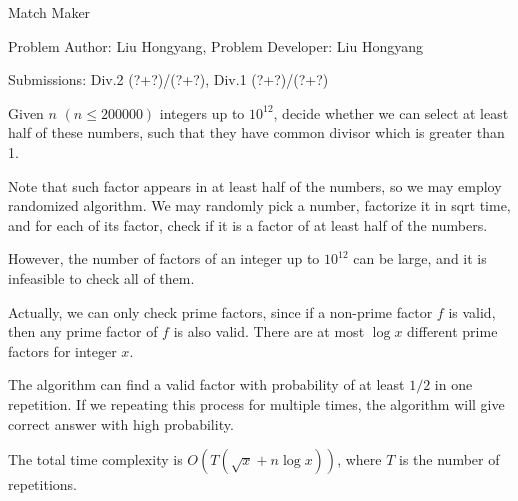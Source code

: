 \begin{Solution}{Match Maker}

\begin{frame}{\ProblemName}

\small Problem Author: Liu Hongyang, Problem Developer: Liu Hongyang \par \vspace{0.3cm}

\small Submissions: Div.2 (?+?)/(?+?), Div.1 (?+?)/(?+?)  \par \vspace{0.5cm}

Given $n$ $(n \leq 200000)$ integers up to $10^{12}$, decide whether we can select at least half of these numbers, such that they have common divisor which is greater than 1.

\par

Note that such factor appears in at least half of the numbers, so we may employ randomized algorithm. We may randomly pick a number, factorize it in sqrt time, and for each of its factor, check if it is a factor of at least half of the numbers.

\par

However, the number of factors of an integer up to $10^{12}$ can be large, and it is infeasible to check all of them.

\end{frame}

\begin{frame}{\ProblemName}

Actually, we can only check prime factors, since if a non-prime factor $f$ is valid, then any prime factor of $f$ is also valid. There are at most $\log x$ different prime factors for integer $x$.

\par

The algorithm can find a valid factor with probability of at least $1/2$ in one repetition. If we repeating this process for multiple times, the algorithm will give correct answer with high probability.

\par

The total time complexity is $O(T(\sqrt{x} + n \log x))$, where $T$ is the number of repetitions.

\end{frame}

\end{Solution}

